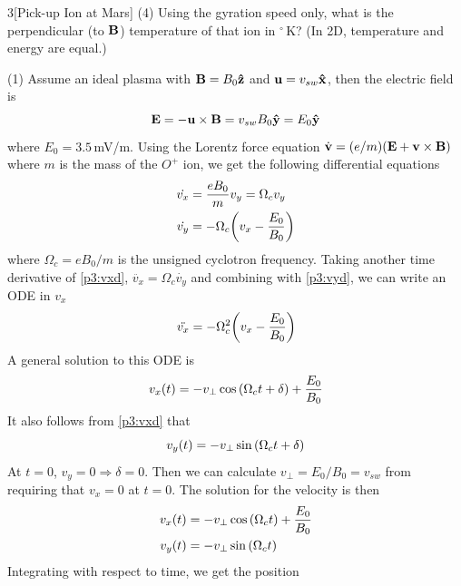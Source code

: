 \documentclass[12pt]{article}
\begin{document}
\begin{problem}{3}[Pick-up Ion at Mars]
(4) Using the gyration speed only, what is the perpendicular (to $\vb{B}$)
temperature of that ion in $^\circ$\,\si{K}? (In 2D, temperature and energy are
equal.)
\begin{solution}
    (1) Assume an ideal plasma with $\vb{B}=B_0\vb{\hat{z}}$ and
    $\vb{u}=v_{sw}\vb{\hat{x}}$, then the electric field is
    \begin{equation}
        \vb{E}=-\vb{u}\times\vb{B}=v_{sw}B_0\vb{\hat{y}}=E_0\vb{\hat{y}}
    \end{equation}
    where $E_0=3.5$\,\si{mV/m}. Using the Lorentz force equation
    $\dot{\vb{v}}=(e/m)(\vb{E}+\vb{v}\times\vb{B})$ where $m$ is the mass of the
    $O^+$ ion, we get the following differential equations
    \begin{subequations}
        \begin{align}
            \dot{v_x}&=\frac{eB_0}{m}v_y=\Omega_cv_y\label{p3:vxd}\\
            \dot{v_y}&=-\Omega_c\qty(v_x-\frac{E_0}{B_0})\label{p3:vyd}
        \end{align} 
    \end{subequations}
    where $\Omega_c=eB_0/m$ is the unsigned cyclotron frequency. Taking another
    time derivative of \eqref{p3:vxd}, $\ddot{v_x}=\Omega_c\dot{v_y}$ and
    combining with \eqref{p3:vyd}, we can write an ODE in $v_x$
    \begin{equation}
        \ddot{v_x}=-\Omega_c^2\qty(v_x-\frac{E_0}{B_0}) 
    \end{equation}
    A general solution to this ODE is
    \begin{equation}
        v_x(t)=-v_\perp\cos\qty(\Omega_ct+\delta)+\frac{E_0}{B_0}
    \end{equation}
    It also follows from \eqref{p3:vxd} that
    \begin{equation}
        v_y(t)=-v_\perp\sin\qty(\Omega_ct+\delta) 
    \end{equation}
    At $t=0$, $v_y=0\Rightarrow\delta=0$. Then we can calculate
    $v_\perp=E_0/B_0=v_{sw}$ from requiring that $v_x=0$ at $t=0$. The solution 
    for the velocity is then
    \begin{subequations}\label{p3:velocity}
        \begin{align}
            v_x(t)&=-v_\perp\cos\qty(\Omega_ct)+\frac{E_0}{B_0}\\ 
            v_y(t)&=-v_\perp\sin\qty(\Omega_ct)
        \end{align} 
    \end{subequations}
    Integrating with respect to time, we get the position

\end{solution}
\end{problem}
\end{document}
